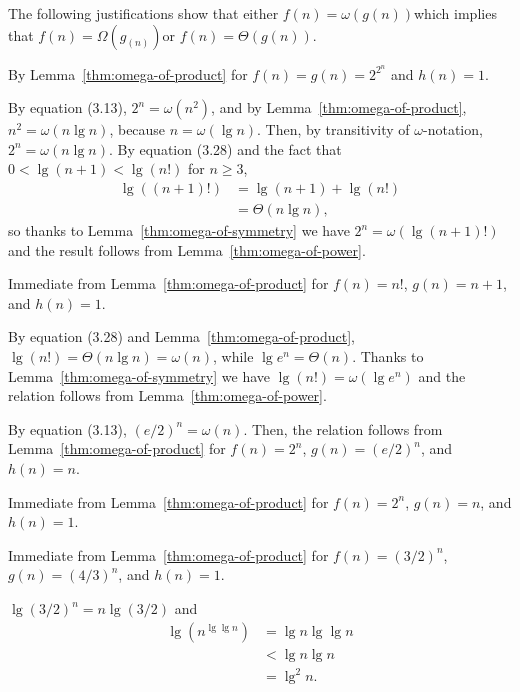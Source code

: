 The following justifications show that either $f(n)=\omega(g(n))$\dash which implies that $f(n)=\Omega(g_(n))$\dash or $f(n)=\Theta(g(n))$.

\begin{description}[style=nextline]
    \item[$2^{2^{n+1}}=\omega\bigl(2^{2^n}\bigr)$]
    By Lemma~\ref{thm:omega-of-product} for $f(n)=g(n)=2^{2^n}$ and $h(n)=1$.
    \item[$2^{2^n}=\omega((n+1)!)$]
    By equation (3.13), $2^n=\omega(n^2)$, and by Lemma~\ref{thm:omega-of-product}, $n^2=\omega(n\lg n)$, because $n=\omega(\lg n)$.
    Then, by transitivity of $\omega$-notation, $2^n=\omega(n\lg n)$.
    By equation (3.28) and the fact that $0<\lg(n+1)<\lg(n!)$ for $n\ge3$,
    \begin{align*}
        \lg((n+1)!) &= \lg(n+1)+\lg(n!) \\
        &= \Theta(n\lg n),
    \end{align*}
    so thanks to Lemma~\ref{thm:omega-of-symmetry} we have $2^n=\omega(\lg(n+1)!)$ and the result follows from Lemma~\ref{thm:omega-of-power}.
    \item[$(n+1)!=\omega(n!)$]
    Immediate from Lemma~\ref{thm:omega-of-product} for $f(n)=n!$, $g(n)=n+1$, and $h(n)=1$.
    \item[$n!=\omega(e^n)$]
    By equation (3.28) and Lemma~\ref{thm:omega-of-product}, $\lg(n!)=\Theta(n\lg n)=\omega(n)$, while $\lg e^n=\Theta(n)$.
    Thanks to Lemma~\ref{thm:omega-of-symmetry} we have $\lg(n!)=\omega(\lg e^n)$ and the relation follows from Lemma~\ref{thm:omega-of-power}.
    \item[$e^n=\omega(n\cdot2^n)$]
    By equation (3.13), $(e/2)^n=\omega(n)$.
    Then, the relation follows from Lemma~\ref{thm:omega-of-product} for $f(n)=2^n$, $g(n)=(e/2)^n$, and $h(n)=n$.
    \item[$n\cdot2^n=\omega(2^n)$]
    Immediate from Lemma~\ref{thm:omega-of-product} for $f(n)=2^n$, $g(n)=n$, and $h(n)=1$.
    \item[$2^n=\omega((3/2)^n)$]
    Immediate from Lemma~\ref{thm:omega-of-product} for $f(n)=(3/2)^n$, $g(n)=(4/3)^n$, and $h(n)=1$.
    \item[$(3/2)^n=\omega(n^{\lg\lg n})$]
    $\lg(3/2)^n=n\lg(3/2)$ and
    \begin{align*}
        \lg(n^{\lg\lg n}) &= \lg n\lg\lg n \\
        &< \lg n\lg n \\
        &= \lg^2n.
    \end{align*}

\end{description}
